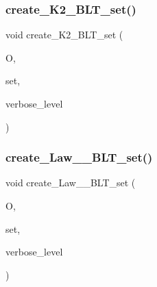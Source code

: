 \subsubsection{\texorpdfstring{create\+\_\+\+K2\+\_\+\+B\+L\+T\+\_\+set()}{create\_K2\_BLT\_set()}}
{\footnotesize\ttfamily void create\+\_\+\+K2\+\_\+\+B\+L\+T\+\_\+set (\begin{DoxyParamCaption}\item[{\mbox{\hyperlink{classorthogonal}{orthogonal}} $\ast$}]{O,  }\item[{\mbox{\hyperlink{galois_8h_a09fddde158a3a20bd2dcadb609de11dc}{I\+NT}} $\ast$}]{set,  }\item[{\mbox{\hyperlink{galois_8h_a09fddde158a3a20bd2dcadb609de11dc}{I\+NT}}}]{verbose\+\_\+level }\end{DoxyParamCaption})}

\mbox{\label{data_8_c_a21488a79cee222161e7bef725c6267fe}} 
\subsubsection{\texorpdfstring{create\+\_\+\+Law\+\_\+\_\+\+B\+L\+T\+\_\+set()}{create\_Law\_71\_BLT\_set()}}
{\footnotesize\ttfamily void create\+\_\+\+Law\+\_\+\_\+\+B\+L\+T\+\_\+set (\begin{DoxyParamCaption}\item[{\mbox{\hyperlink{classorthogonal}{orthogonal}} $\ast$}]{O,  }\item[{\mbox{\hyperlink{galois_8h_a09fddde158a3a20bd2dcadb609de11dc}{I\+NT}} $\ast$}]{set,  }\item[{\mbox{\hyperlink{galois_8h_a09fddde158a3a20bd2dcadb609de11dc}{I\+NT}}}]{verbose\+\_\+level }\end{DoxyParamCaption})}

\mbox{\label{data_8_c_a9a35af1dd478ad49c6922240bfff89dd}} 
